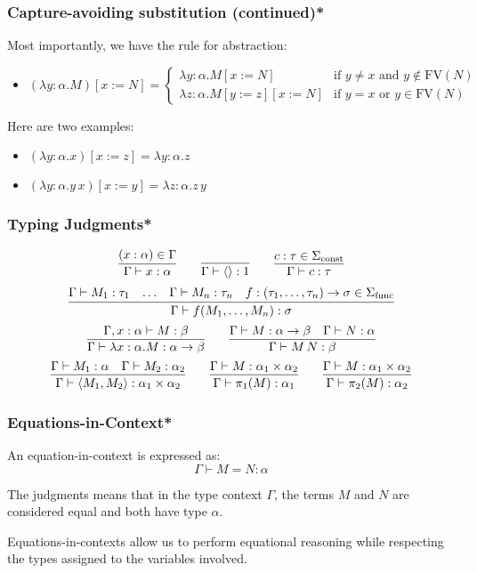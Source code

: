 \documentclass[aspectratio=169]{beamer}
\begin{document}
\begin{frame}
\frametitle{Capture-avoiding substitution (continued)*}

Most importantly, we have the rule for abstraction:

\begin{itemize}
    \item $(\lambda y : \alpha. M)[x := N] =
    \begin{cases}
    \lambda y : \alpha. M[x := N] & \text{if } y \neq x \text{ and } y \notin \text{FV}(N) \\
    \lambda z : \alpha. M[y := z][x := N] & \text{if } y = x \text{ or } y \in \text{FV}(N)
    \end{cases}$
\end{itemize}
\pause
Here are two examples:
\begin{itemize}
    \item $(\lambda y : \alpha. x)[x := z] = \lambda y : \alpha. z$
    \item $(\lambda y : \alpha. y \, x)[x := y] = \lambda z : \alpha. z \, y$
\end{itemize}

\end{frame}

\begin{frame}
\frametitle{Typing Judgments*}

\[
\infer{\Gamma \vdash x : \alpha}{(x : \alpha) \in \Gamma}
\qquad
\infer{\Gamma \vdash \langle \rangle : 1}{}
\qquad
\infer{\Gamma \vdash c : \tau}{c : \tau \in \Sigma_{\text{const}}}
\]
\pause
\[
\infer{\Gamma \vdash f(M_1, \ldots, M_n) : \sigma}{\Gamma \vdash M_1 : \tau_1 & \ldots & \Gamma \vdash M_n : \tau_n & f : (\tau_1, \ldots, \tau_n) \rightarrow \sigma \in \Sigma_{\text{func}}}
\]
\pause
\[
\infer{\Gamma \vdash \lambda x : \alpha. M : \alpha \rightarrow \beta}{\Gamma, x : \alpha \vdash M : \beta}
\qquad
\infer{\Gamma \vdash M \, N : \beta}{\Gamma \vdash M : \alpha \rightarrow \beta & \Gamma \vdash N : \alpha}
\]
\pause
\[
\infer{\Gamma \vdash \langle M_1, M_2 \rangle : \alpha_1 \times \alpha_2}{\Gamma \vdash M_1 : \alpha & \Gamma \vdash M_2 : \alpha_2}
\qquad
\infer{\Gamma \vdash \pi_1(M) : \alpha_1}{\Gamma \vdash M : \alpha_1 \times \alpha_2}
\qquad
\infer{\Gamma \vdash \pi_2(M) : \alpha_2}{\Gamma \vdash M : \alpha_1 \times \alpha_2}
\]
\end{frame}

\begin{frame}
\frametitle{Equations-in-Context*}

An equation-in-context is expressed as:
\[
\Gamma \vdash M = N : \alpha
\]

The judgments means that in the type context $\Gamma$, the terms $M$ and $N$ are considered equal and both have type $\alpha$.

\medskip

Equations-in-contexts allow us to perform equational reasoning while respecting the types assigned to the variables involved.
\end{frame}
\end{document}
